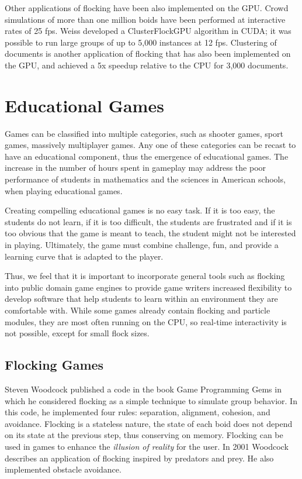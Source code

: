Other applications of flocking have been also implemented on the GPU. Crowd simulations of more than one million boids have been performed at interactive rates of 25 fps\cite{supermassiveCrowd}. Weiss developed a ClusterFlockGPU algorithm in CUDA; it was possible to run large groups of up to 5,000 instances at 12 fps\cite{SI_GPU}. Clustering of documents is another application of flocking that has also been implemented on the GPU, and achieved a 5x speedup relative to the CPU for 3,000 documents\cite{document2}. 

\section{Educational Games}
Games can be classified into multiple categories, such as shooter games, sport games, massively multiplayer games. Any one of these categories can be recast to have an educational component, thus the emergence of educational games. The increase in the number of hours spent in  gameplay may address the poor performance of students in mathematics and the sciences in American schools, when playing educational games. 

 Creating compelling educational games is no easy task. If it is too easy, the students do not learn, if it is too difficult, the students are frustrated and if it is too obvious that the game is meant to teach, the student might not be interested in playing. Ultimately, the game must combine challenge, fun, and provide a learning curve that is adapted to the player.

Thus, we feel that it is important to incorporate general tools such as flocking into public domain game engines to provide game writers increased flexibility to develop software that help students to learn within an environment they are comfortable with. While some games already contain flocking and particle modules, they are most often running on the CPU, so real-time interactivity is not possible, except for small flock sizes. 

\subsection{Flocking Games}
Steven Woodcock published a code in the book Game Programming Gems in which he considered flocking as a simple technique to simulate group behavior\cite{gems1}. In this code, he implemented four rules: separation, alignment, cohesion, and avoidance.  Flocking is a stateless nature, the state of each boid does not depend on its state at the previous step, thus conserving on memory. Flocking can be used in games to enhance the \textit{illusion of reality} for the user.  In 2001 Woodcock describes an application of flocking inspired by predators and prey\cite{gems2}. 
He also implemented obstacle avoidance.

